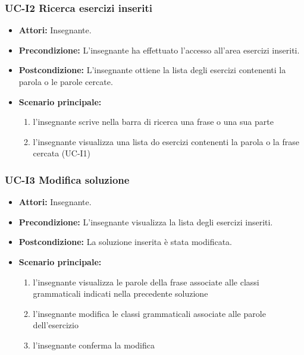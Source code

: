 \subsubsection{UC-I2 Ricerca esercizi inseriti}
\begin{itemize}
	\item \textbf{Attori:} Insegnante.
	\item \textbf{Precondizione:} L'insegnante ha effettuato l'accesso all'area esercizi inseriti.
	\item \textbf{Postcondizione:} L'insegnante ottiene la lista degli esercizi contenenti la parola o le parole cercate.
	\item \textbf{Scenario principale:}
		\begin{enumerate}
				\item l'insegnante scrive nella barra di ricerca una frase o una sua parte
				\item l'insegnante visualizza una lista do esercizi contenenti la parola o la frase cercata (UC-I1)
		\end{enumerate}
\end{itemize}

\subsubsection{UC-I3 Modifica soluzione}
\begin{itemize}
	\item \textbf{Attori:} Insegnante.
	\item \textbf{Precondizione:} L'insegnante visualizza la lista degli esercizi inseriti.
	\item \textbf{Postcondizione:} La soluzione inserita è stata modificata.
	\item \textbf{Scenario principale:}
		\begin{enumerate}
		\item l'insegnante visualizza le parole della frase associate alle classi grammaticali indicati nella precedente soluzione
		\item l'insegnante modifica le classi grammaticali associate alle parole dell'esercizio
		\item l'insegnante conferma la modifica
		\end{enumerate}
\end{itemize}
	
